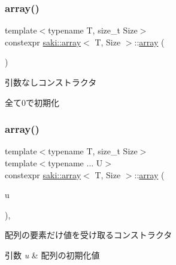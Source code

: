 \subsubsection{\texorpdfstring{array()}{array()}\hspace{0.1cm}{\footnotesize\ttfamily [1/4]}}
{\footnotesize\ttfamily template$<$typename T, size\+\_\+t Size$>$ \\
constexpr \mbox{\hyperlink{classsaki_1_1array}{saki\+::array}}$<$ T, Size $>$\+::\mbox{\hyperlink{classsaki_1_1array}{array}} (\begin{DoxyParamCaption}{ }\end{DoxyParamCaption})\hspace{0.3cm}{\ttfamily [inline]}}



引数なしコンストラクタ 

全て0で初期化 \mbox{\label{classsaki_1_1array_a78ce1a324e430c40d828efd74c700719}} 
\subsubsection{\texorpdfstring{array()}{array()}\hspace{0.1cm}{\footnotesize\ttfamily [2/4]}}
{\footnotesize\ttfamily template$<$typename T, size\+\_\+t Size$>$ \\
template$<$typename ... U$>$ \\
constexpr \mbox{\hyperlink{classsaki_1_1array}{saki\+::array}}$<$ T, Size $>$\+::\mbox{\hyperlink{classsaki_1_1array}{array}} (\begin{DoxyParamCaption}\item[{const U \&...}]{u }\end{DoxyParamCaption})\hspace{0.3cm}{\ttfamily [inline]}, {\ttfamily [explicit]}}



配列の要素だけ値を受け取るコンストラクタ 


\begin{DoxyParams}{引数}
{\em u} & 配列の初期化値 \\
\hline
\end{DoxyParams}
\mbox{\label{classsaki_1_1array_a788262c2c0f097b6e8f1a9fbd6bf0034}} 
